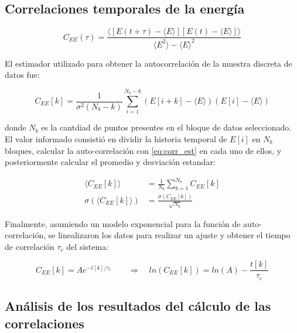 \documentclass[a4paper,12pt]{article}
\begin{document}
\subsection{Correlaciones temporales de la energía}

\begin{equation}\label{eq:corr_teo}
C_{EE}(\tau) = \frac{\langle \left[E(t+\tau)-\langle 
E\rangle\right]\left[E(t)-\langle E \rangle\right] \rangle
}{\langle E^2\rangle - \langle E \rangle ^2}
\end{equation}

El estimador utilizado para obtener la autocorrelación de la muestra discreta 
de datos fue:

\begin{equation}\label{eq:corr_est}
C_{EE}[k] = \frac{1}{\sigma^2(N_b-k)} \sum_{i=1}^{N_b - k}\left(E[i+k] - 
\langle E \rangle\right)\left(E[i]-\langle E\rangle\right)
\end{equation}

\noindent donde $N_b$ es la cantdiad de puntos presentes en el bloque de datos 
seleccionado. El valor informado consistió en dividir la historia temporal de 
$E[i]$ en $N_b$ bloques, calcular la auto-correlación con \eqref{eq:corr_est} 
en cada uno de ellos, y posteriormente calcular el promedio y desviación 
estandar:

\begin{subequations}
\begin{align}
\langle C_{EE}[k]\rangle &= \frac{1}{N_b} \sum_{b=1}^{N_b} C_{EE}[k]\\
\sigma(\langle C_{EE}[k]\rangle) &= \frac{\sigma(C_{EE}[k])}{\sqrt{N_b}}
\end{align}
\end{subequations}

Finalmente, asumiendo un modelo exponencial para la función de 
auto-correlación, se linealizaron los datos para realizar un ajuste y obtener 
el tiempo de correlación $\tau_c$ del sistema:

\begin{equation}
C_{EE}[k]=A e^{-t[k]/\tau_c} \qquad \Rightarrow \quad ln\left(C_{EE}[k]\right) 
= ln(A) - \frac{t[k]}{\tau_c}
\end{equation}

\subsection{Análisis de los resultados del cálculo de las correlaciones}
\end{document}

